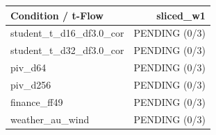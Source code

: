 \begin{tabular}{lr}
\hline
Condition / t-Flow & sliced\_w1 \\
\hline
student\_t\_d16\_df3.0\_cor & PENDING (0/3) \\
student\_t\_d32\_df3.0\_cor & PENDING (0/3) \\
piv\_d64 & PENDING (0/3) \\
piv\_d256 & PENDING (0/3) \\
finance\_ff49 & PENDING (0/3) \\
weather\_au\_wind & PENDING (0/3) \\
\hline
\end{tabular}
